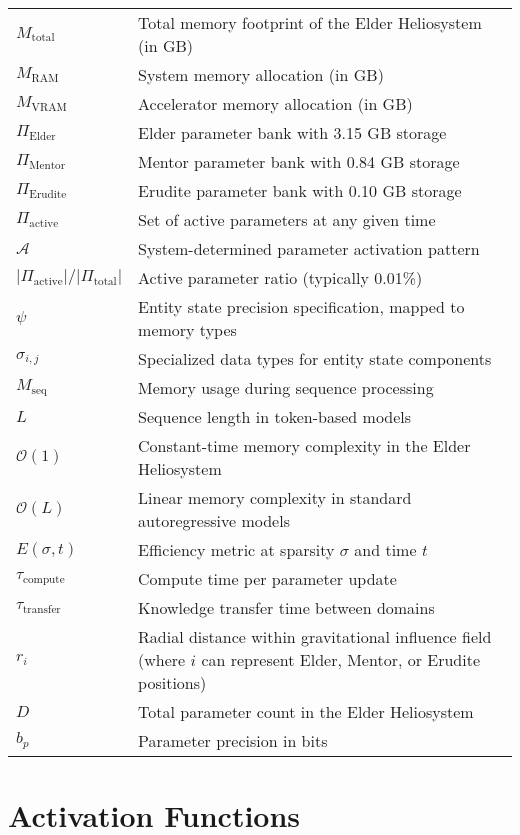 \begin{tabular}{p{3cm} p{12cm}}
$M_{\text{total}}$ & Total memory footprint of the Elder Heliosystem (in GB) \\
$M_{\text{RAM}}$ & System memory allocation (in GB) \\
$M_{\text{VRAM}}$ & Accelerator memory allocation (in GB) \\
$\Pi_{\text{Elder}}$ & Elder parameter bank with 3.15 GB storage \\
$\Pi_{\text{Mentor}}$ & Mentor parameter bank with 0.84 GB storage \\
$\Pi_{\text{Erudite}}$ & Erudite parameter bank with 0.10 GB storage \\
$\Pi_{\text{active}}$ & Set of active parameters at any given time \\
$\mathcal{A}$ & System-determined parameter activation pattern \\
$|\Pi_{\text{active}}|/|\Pi_{\text{total}}|$ & Active parameter ratio (typically 0.01\%) \\
$\psi$ & Entity state precision specification, mapped to memory types \\
$\sigma_{i,j}$ & Specialized data types for entity state components \\
$M_{\text{seq}}$ & Memory usage during sequence processing \\
$L$ & Sequence length in token-based models \\
$\mathcal{O}(1)$ & Constant-time memory complexity in the Elder Heliosystem \\
$\mathcal{O}(L)$ & Linear memory complexity in standard autoregressive models \\
$E(\sigma,t)$ & Efficiency metric at sparsity $\sigma$ and time $t$ \\
$\tau_{\text{compute}}$ & Compute time per parameter update \\
$\tau_{\text{transfer}}$ & Knowledge transfer time between domains \\
$r_i$ & Radial distance within gravitational influence field (where $i$ can represent Elder, Mentor, or Erudite positions) \\
$D$ & Total parameter count in the Elder Heliosystem \\
$b_p$ & Parameter precision in bits \\
\end{tabular}

\newpage
\section*{Activation Functions}

